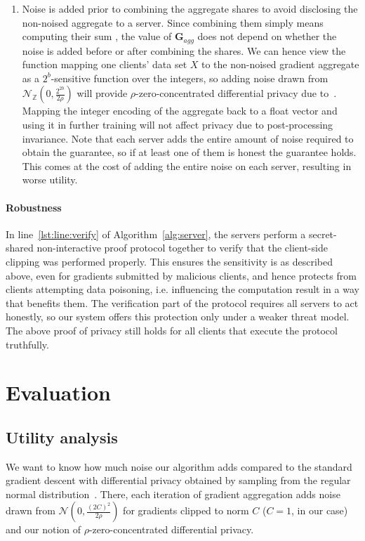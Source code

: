 \documentclass{article}
\begin{document}
\begin{enumerate}
\item Noise is added prior to combining the aggregate shares to avoid disclosing the non-noised aggregate to a server. Since combining them simply means computing their sum \cite[Step 3 of Scheme on page 3]{prio}, the value of $\textbf{G}_{agg}$ does not depend on whether the noise is added before or after combining the shares. We can hence view the function mapping one clients' data set $X$ to the non-noised gradient aggregate as a $2^b$-sensitive function over the integers, so adding noise drawn from $\mathcal N_\mathbb{Z}\left(0,\frac{2^{2b}}{2\rho}\right)$ will provide $\rho$-zero-concentrated differential privacy due to~\cite[Theorem 14 on page 15, with all $\sigma_j=\frac{2^{2b}}{2\rho}$]{DBLP:journals/corr/abs-2004-00010}. Mapping the integer encoding of the aggregate back to a float vector and using it in further training will not affect privacy due to post-processing invariance. Note that each server adds the entire amount of noise required to obtain the guarantee, so if at least one of them is honest the guarantee holds. This comes at the cost of adding the entire noise on each server, resulting in worse utility.
\end{enumerate}

\paragraph{Robustness}
In line~\ref{lst:line:verify} of Algorithm~\ref{alg:server}, the servers perform a secret-shared non-interactive proof protocol \cite[Section 4]{prio} together to verify that the client-side clipping was performed properly. This ensures the sensitivity is as described above, even for gradients submitted by malicious clients, and hence protects from clients attempting data poisoning, i.e. influencing the computation result in a way that benefits them. The verification part of the protocol requires all servers to act honestly, so our system offers this protection only under a weaker threat model. The above proof of privacy still holds for all clients that execute the protocol truthfully.

\section{Evaluation}

\subsection{Utility analysis}
We want to know how much noise our algorithm adds compared to the standard gradient descent with differential privacy obtained by sampling from the regular normal distribution~\cite{Abadi_2016}. There, each iteration of gradient aggregation adds noise drawn from $\mathcal N\left(0,\frac{(2C)^2}{2\rho}\right)$ for gradients clipped to norm $C$ ($C=1$, in our case) and our notion of $\rho$-zero-concentrated differential privacy.
\end{document}
